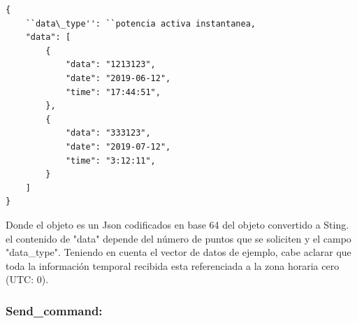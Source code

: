 \begin{Verbatim}[tabsize=4]
{
	``data\_type'': ``potencia activa instantanea,
	"data": [
		{
			"data": "1213123",
			"date": "2019-06-12",
			"time": "17:44:51",
		},
		{
			"data": "333123",
			"date": "2019-07-12",
			"time": "3:12:11",
		}
	]
}
\end{Verbatim}
Donde el objeto es un Json codificados en base 64 del objeto convertido a Sting. el contenido de "data" depende del número de puntos que se soliciten y el campo "data\_type". Teniendo en cuenta el vector de datos de ejemplo, cabe aclarar que toda la información temporal recibida esta referenciada a la zona horaria cero (UTC: 0).

\subsubsection{Send\_command:}

